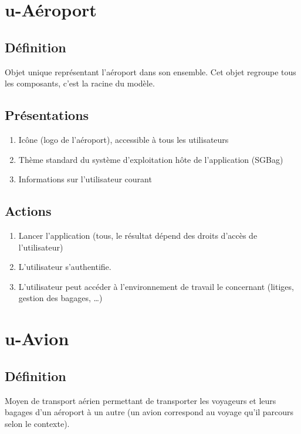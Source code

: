 \newcommand\topologie[1]{Ajouter, modifier ou supprimer #1 (configuration de la topologie de l'aéroport)}
\newcommand\selectionner[1]{Sélectionner #1 (afficher sa configuration)}
\newcommand\rectetiquette{Rectangle étiquetté}
\newcommand\transit{Visualiser le transit de bagages dans cette zone}
\newcommand\etat{Afficher l'état}

\section{u-Aéroport}
\subsection{Définition}
Objet unique représentant l'aéroport dans son ensemble. Cet objet regroupe tous les
composants, c'est la racine du modèle.

\subsection{Présentations}
\begin{enumerate}
	\item Icône (logo de l'aéroport), accessible à tous les utilisateurs
	\item Thème standard du système d'exploitation hôte de l'application (SGBag)
	\item Informations sur l'utilisateur courant
\end{enumerate}

\subsection{Actions}
\begin{enumerate}
	\item Lancer l'application (tous, le résultat dépend des droits d'accès de l'utilisateur)
	\item L'utilisateur s'authentifie.
	\item L'utilisateur peut accéder à l'environnement de travail le concernant (litiges, gestion des bagages, \ldots)
\end{enumerate}

\section{u-Avion}
\subsection{Définition}
	Moyen de transport aérien permettant de transporter les voyageurs et leurs bagages d'un
	aéroport à un autre (un avion correspond au voyage qu'il parcours selon le contexte).

